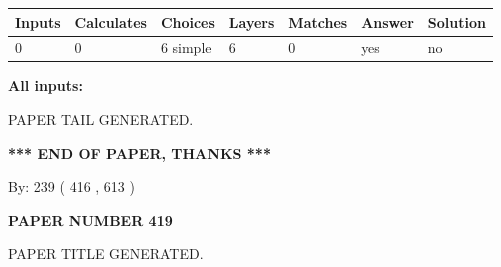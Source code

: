 \documentclass{ctexart}
\begin{document}
 
   
   
   
   
\noindent\begin{tabular}{|l|l|l|l|l|l|l|}
 \hline
Inputs & Calculates & Choices & Layers & Matches & Answer & Solution \\ \hline
 0  & 
 0  & 
 6
  simple  
  & 
 6  & 
 0  & 
  yes & 
  no 
  \\ \hline
 \end{tabular}
   
   
   
   
\noindent{}
   
   
   
   
\noindent\vspace{0.1in}\hspace{-0.08in} {\textbf{\Large{All inputs: }}}
   
   
   
   
   
   
 \vspace{0.2in}
 
   
   
\vspace{2.0in} PAPER TAIL GENERATED.
   
   
   
   
\vspace{1.0in} 
{\textbf{\large{ *** END OF PAPER, THANKS *** }}} 
   
   
\hspace{1.0in} By: 
 239 ( 416 ,  613 )
   
   
   
   
\newpage 
\setcounter{page}{ 
   419001 } 
   
   
   
   
 {\textbf{ \Large{ PAPER NUMBER  419  }}}
   
   
\vspace{0.2in}
   
   
   
   
   
   
   
   
 \vspace{0.2in}
 
 
 
 
   
   
 PAPER TITLE GENERATED.
   
\end{document}
